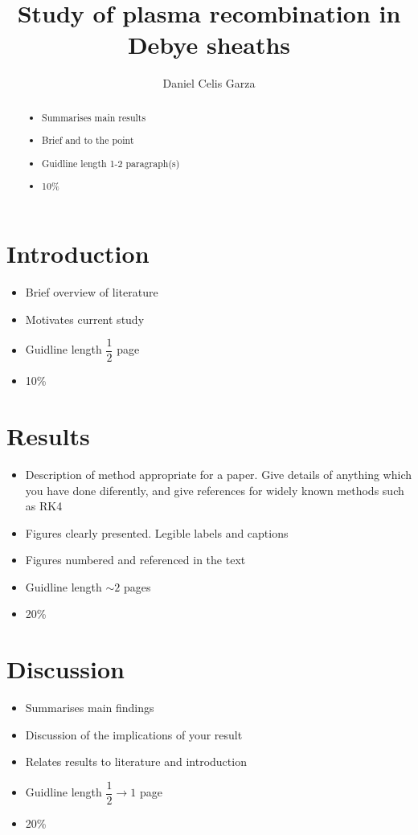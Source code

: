 \documentclass[aip,apl,reprint]{revtex4-1}
\begin{document}
	\title{Study of plasma recombination in Debye sheaths}
	\author{Daniel Celis Garza}
	\begin{abstract}
		\begin{itemize}
			\item Summarises main results
			\item Brief and to the point
			\item Guidline length 1-2 paragraph(s)
			\item 10\%
		\end{itemize}
	\end{abstract}
	\maketitle
	
	\section{Introduction}
	\begin{itemize}
		\item Brief overview of literature
		\item Motivates current study
		\item Guidline length $\dfrac{1}{2}$ page
		\item 10\%
	\end{itemize}
	
	\section{Results}
	\begin{itemize}
		\item Description of method appropriate for a paper. Give details of anything which you have done diferently, and give references for widely known methods such as RK4
		\item Figures clearly presented. Legible labels and captions
		\item Figures numbered and referenced in the text
		\item Guidline length $\sim 2$ pages
		\item 20\%
	\end{itemize}
	
	\section{Discussion}
	\begin{itemize}
		\item Summarises main findings
		\item Discussion of the implications of your result
		\item Relates results to literature and introduction
		\item Guidline length $ \dfrac{1}{2} \to 1 $ page
		\item 20\%
	\end{itemize}
	
\end{document}
